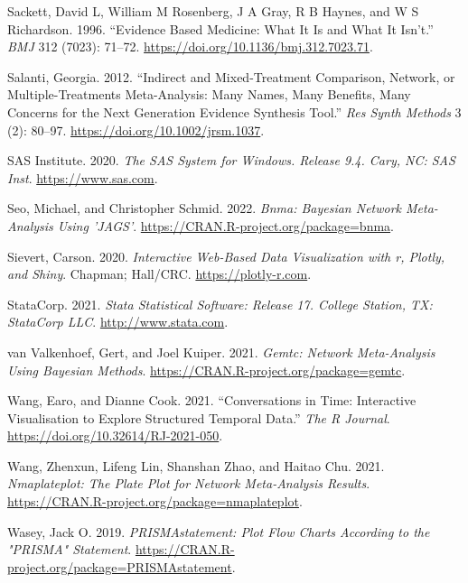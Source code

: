 \begin{CSLReferences}{1}{0}
\leavevmode{}%
Sackett, David L, William M Rosenberg, J A Gray, R B Haynes, and W S Richardson. 1996. {``Evidence Based Medicine: What It Is and What It Isn't.''} \emph{BMJ} 312 (7023): 71--72. \url{https://doi.org/10.1136/bmj.312.7023.71}.

\leavevmode{}%
Salanti, Georgia. 2012. {``Indirect and Mixed-Treatment Comparison, Network, or Multiple-Treatments Meta-Analysis: Many Names, Many Benefits, Many Concerns for the Next Generation Evidence Synthesis Tool.''} \emph{Res Synth Methods} 3 (2): 80--97. \url{https://doi.org/10.1002/jrsm.1037}.

\leavevmode{}%
SAS Institute. 2020. \emph{{The SAS System for Windows}. Release 9.4. Cary, NC: SAS Inst}. \url{https://www.sas.com}.

\leavevmode{}%
Seo, Michael, and Christopher Schmid. 2022. \emph{Bnma: Bayesian Network Meta-Analysis Using 'JAGS'}. \url{https://CRAN.R-project.org/package=bnma}.

\leavevmode{}%
Sievert, Carson. 2020. \emph{{Interactive Web-Based Data Visualizatio}n with r, Plotly, and Shiny}. Chapman; Hall/CRC. \url{https://plotly-r.com}.

\leavevmode{}%
StataCorp. 2021. \emph{{Stata Statistical Software: Release 17}. College Station, TX: StataCorp LLC}. \url{http://www.stata.com}.

\leavevmode{}%
van Valkenhoef, Gert, and Joel Kuiper. 2021. \emph{Gemtc: Network Meta-Analysis Using Bayesian Methods}. \url{https://CRAN.R-project.org/package=gemtc}.

\leavevmode{}%
Wang, Earo, and Dianne Cook. 2021. {``Conversations in Time: Interactive Visualisation to Explore Structured Temporal Data.''} \emph{The R Journal}. \url{https://doi.org/10.32614/RJ-2021-050}.

\leavevmode{}%
Wang, Zhenxun, Lifeng Lin, Shanshan Zhao, and Haitao Chu. 2021. \emph{Nmaplateplot: The Plate Plot for Network Meta-Analysis Results}. \url{https://CRAN.R-project.org/package=nmaplateplot}.

\leavevmode{}%
Wasey, Jack O. 2019. \emph{PRISMAstatement: Plot Flow Charts According to the "PRISMA" Statement}. \url{https://CRAN.R-project.org/package=PRISMAstatement}.

\end{CSLReferences}

